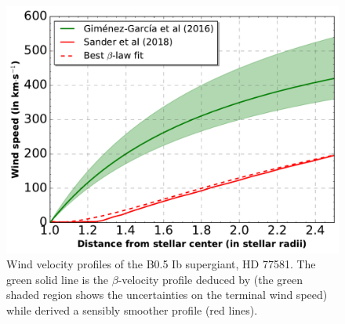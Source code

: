 \documentclass[letter]{aa}
\begin{document}
\begin{figure}
\centering
\includegraphics[width=1\columnwidth]{Pictures/vel_prof.pdf}
\caption{Wind velocity profiles of the B0.5 Ib supergiant, HD 77581. The green solid line is the $\beta$-velocity profile deduced by \cite{Gimenez-Garcia2016} (the green shaded region shows the uncertainties on the terminal wind speed) while \cite{Sander2017} derived a sensibly smoother profile (red lines).}
\label{fig:vel_prof}
\end{figure} 
%
%
%
\end{document}
